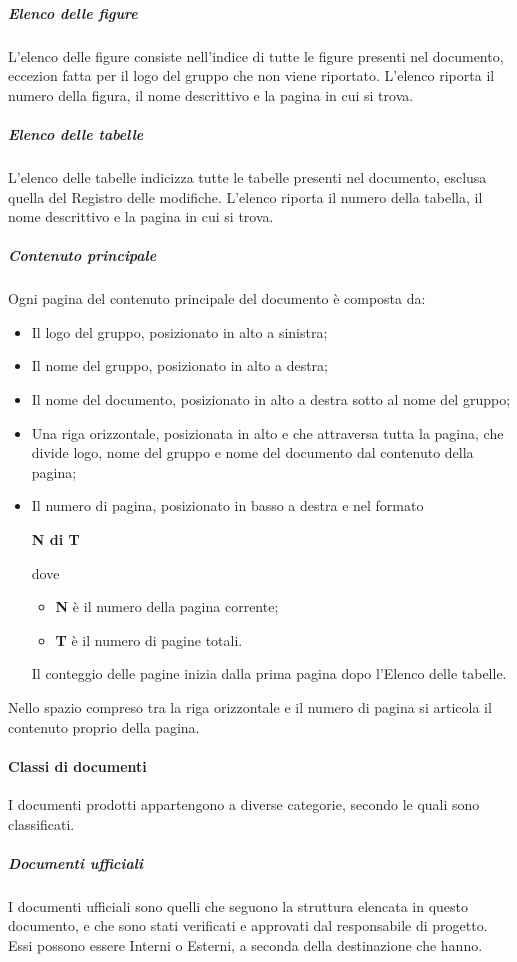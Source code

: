 \documentclass[../norme-di-progetto.tex]{subfiles}
\begin{document}
\subparagraph{Elenco delle figure}
L'elenco delle figure consiste nell'indice di tutte le figure presenti nel documento, eccezion fatta per il logo del gruppo che non viene riportato. L'elenco riporta il numero della figura, il nome descrittivo e la pagina in cui si trova.

\subparagraph{Elenco delle tabelle}
L'elenco delle tabelle indicizza tutte le tabelle presenti nel documento, esclusa quella del Registro delle modifiche. L'elenco riporta il numero della tabella, il nome  descrittivo e la pagina in cui si trova.

\subparagraph{Contenuto principale}
Ogni pagina del contenuto principale del documento è composta da:
\begin{itemize}
  \item Il logo del gruppo, posizionato in alto a sinistra;
  \item Il nome del gruppo, posizionato in alto a destra;
  \item Il nome del documento, posizionato in alto a destra sotto al nome del gruppo;
  \item Una riga orizzontale, posizionata in alto e che attraversa tutta la pagina, che divide logo, nome del gruppo e nome del documento dal contenuto della pagina;
  \item Il numero di pagina, posizionato in basso a destra e nel formato \\ \begin{center}
    \centering
    \textbf{N di T}
  \end{center} dove
\begin{itemize}
  \item \textbf{N} è il numero della pagina corrente;
  \item \textbf{T} è il numero di pagine totali.
\end{itemize}
Il conteggio delle pagine inizia dalla prima pagina dopo l'Elenco delle tabelle.
\end{itemize}
Nello spazio compreso tra la riga orizzontale e il numero di pagina si articola il contenuto proprio della pagina.

\paragraph{Classi di documenti}
I documenti prodotti appartengono a diverse categorie, secondo le quali sono classificati.

\subparagraph{Documenti ufficiali}
I documenti ufficiali sono quelli che seguono la struttura elencata in questo documento, e che sono stati verificati e approvati dal responsabile di progetto. Essi possono essere Interni o Esterni, a seconda della destinazione che hanno.
\end{document}
